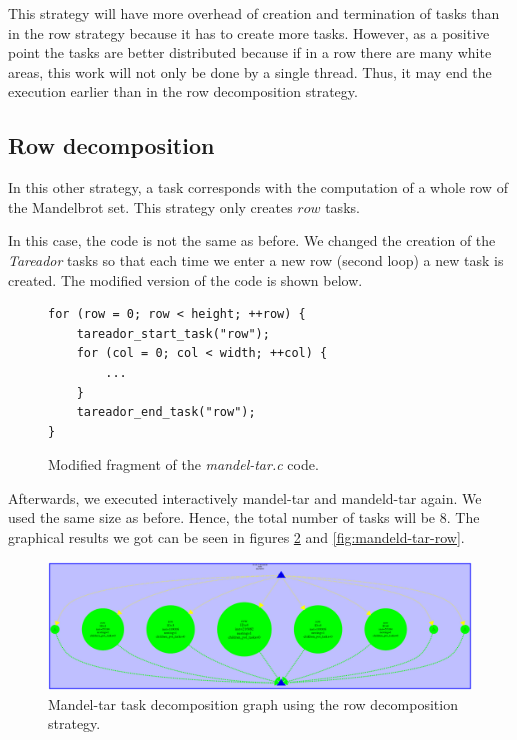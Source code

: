 \documentclass[12pt, a4paper]{article}
\begin{document}
This strategy will have more overhead of creation and termination of tasks than in the row strategy because it has to create more tasks. However, as a positive point the tasks are better distributed because if in a row there are many white areas, this work will not only be done by a single thread. Thus, it may end the execution earlier than in the row decomposition strategy.

\subsection{Row decomposition}

In this other strategy, a task corresponds with the computation of a whole row of the Mandelbrot set. This strategy only creates $row$ tasks.

In this case, the code is not the same as before. We changed the creation of the \textit{Tareador} tasks so that each time we enter a new row (second loop) a new task is created. The modified version of the code is shown below.

\begin{figure}[H]
\begin{lstlisting}
for (row = 0; row < height; ++row) {
	tareador_start_task("row");
	for (col = 0; col < width; ++col) {
		...
	}
	tareador_end_task("row");
}
\end{lstlisting}
\caption{Modified fragment of the \textit{mandel-tar.c} code.}
\label{code:mandeltarRow}
\end{figure}

Afterwards, we executed interactively mandel-tar and mandeld-tar again. We used the same size as before. Hence, the total number of tasks will be 8. The graphical results we got can be seen in figures \ref{fig:mandel-tar-row} and \ref{fig:mandeld-tar-row}.

\begin{figure}[H]
	\centering
	\includegraphics[scale=0.106]{./mandel-tar_row}
	\caption{Mandel-tar task decomposition graph using the row decomposition strategy.}
	\label{fig:mandel-tar-row}
\end{figure}
\end{document}
